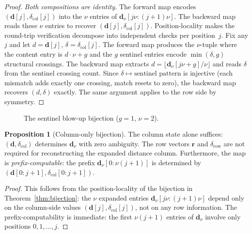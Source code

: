\documentclass[11pt, a4paper]{article}
\theoremstyle{definition}
\newtheorem{proposition}[theorem]{Proposition}
\theoremstyle{remark}
\newcommand{\dcol}{\mathbf{d}}
\newcommand{\drow}{\mathbf{r}}
\begin{document}
\begin{proof}
\emph{Both compositions are identity.}\enspace
The forward map encodes $(\dcol[j], \delta_{\mathrm{col}}[j])$
into the $\nu$ entries of $\dcol_\nu[j\nu{:}(j{+}1)\nu]$.
The backward map reads these $\nu$ entries to recover
$(\dcol[j], \delta_{\mathrm{col}}[j])$.  Position-locality makes
the round-trip verification decompose into independent checks per
position~$j$.
Fix any $j$ and let $d = \dcol[j]$,
$\delta = \delta_{\mathrm{col}}[j]$.
The forward map produces
the $\nu$-tuple where the content entry is $d \cdot \nu + g$ and
the $g$ sentinel entries encode $\min(\delta, g)$ structural
crossings.
The backward map extracts
$d = \lfloor \dcol_\nu[j\nu{+}g] / \nu \rfloor$ and reads
$\delta$ from the sentinel crossing count.
Since
$\delta \mapsto \text{sentinel pattern}$ is injective (each
mismatch adds exactly one crossing, match resets to zero), the
backward map recovers $(d, \delta)$ exactly.
The same argument
applies to the row side by symmetry.
\end{proof}

\begin{figure}[!htbp]
\centering
\resizebox{\linewidth}{!}{}
\caption{The sentinel blow-up bijection ($g{=}1$, $\nu{=}2$).}
\label{fig:blowup}
\end{figure}

\begin{proposition}[Column-only bijection]
\label{prop:col-bijection}
The column state alone suffices: $(\dcol, \delta_{\mathrm{col}})$
determines $\dcol_\nu$ with zero ambiguity.
The row vectors
$\drow$ and $\delta_{\mathrm{row}}$ are not required for
reconstructing the expanded distance column.
Furthermore, the
map is \emph{prefix-computable}: the prefix
$\dcol_\nu[0{:}\nu(j{+}1)]$ is determined by
$(\dcol[0{:}j{+}1], \delta_{\mathrm{col}}[0{:}j{+}1])$.
\end{proposition}

\begin{proof}
This follows from the position-locality of the bijection in
Theorem~\ref{thm:bijection}: the $\nu$ expanded entries
$\dcol_\nu[j\nu{:}(j{+}1)\nu]$ depend only on the column-side
values $(\dcol[j], \delta_{\mathrm{col}}[j])$, not on any row
information.
The prefix-computability is immediate: the first
$\nu(j{+}1)$ entries of $\dcol_\nu$ involve only positions
$0, 1, \dots, j$.
\end{proof}
\end{document}

